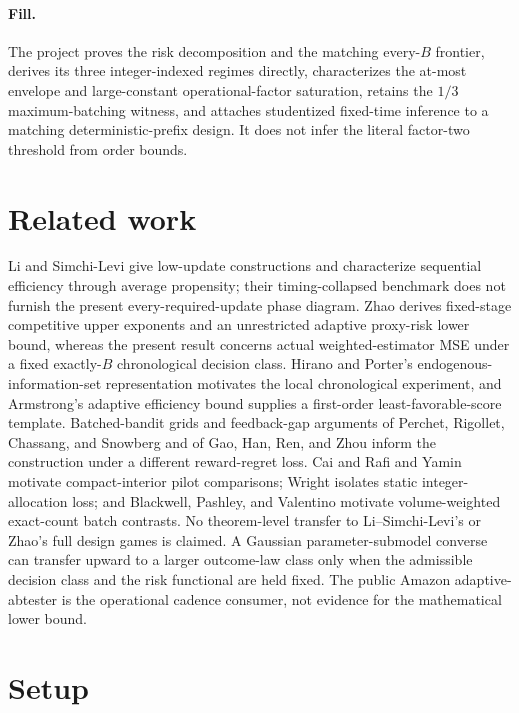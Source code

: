 \documentclass{article}
\begin{document}
\paragraph{Fill.} The project proves the risk decomposition and the matching every-\(B\) frontier, derives its three integer-indexed regimes directly, characterizes the at-most envelope and large-constant operational-factor saturation, retains the \(1/3\) maximum-batching witness, and attaches studentized fixed-time inference to a matching deterministic-prefix design. It does not infer the literal factor-two threshold from order bounds.

\section{Related work}

Li and Simchi-Levi give low-update constructions and characterize sequential efficiency through average propensity; their timing-collapsed benchmark does not furnish the present every-required-update phase diagram. Zhao derives fixed-stage competitive upper exponents and an unrestricted adaptive proxy-risk lower bound, whereas the present result concerns actual weighted-estimator MSE under a fixed exactly-\(B\) chronological decision class. Hirano and Porter's endogenous-information-set representation motivates the local chronological experiment, and Armstrong's adaptive efficiency bound supplies a first-order least-favorable-score template. Batched-bandit grids and feedback-gap arguments of Perchet, Rigollet, Chassang, and Snowberg and of Gao, Han, Ren, and Zhou inform the construction under a different reward-regret loss. Cai and Rafi and Yamin motivate compact-interior pilot comparisons; Wright isolates static integer-allocation loss; and Blackwell, Pashley, and Valentino motivate volume-weighted exact-count batch contrasts. No theorem-level transfer to Li--Simchi-Levi's or Zhao's full design games is claimed. A Gaussian parameter-submodel converse can transfer upward to a larger outcome-law class only when the admissible decision class and the risk functional are held fixed. The public Amazon adaptive-abtester is the operational cadence consumer, not evidence for the mathematical lower bound.

\section{Setup}
\end{document}
